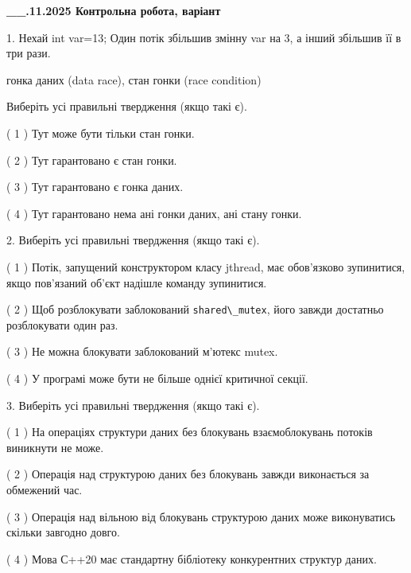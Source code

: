 \documentclass[12pt, ukrainian]{article}
\def\code#1{\Verb!#1!}
\begin{document}
\newpage
\begin {large}

\textbf{\_\_.11.2025 Контрольна робота, варіант  }\par


{
1. Нехай int var=13; Один потік збільшив змінну var на 3, а інший збільшив її в три рази.

гонка даних (data race), стан гонки (race condition)

Виберіть усі правильні твердження (якщо такі є).\par
\vspace{2mm}
( 1 ) Тут може бути тільки стан гонки.%

( 2 ) Тут гарантовано є стан гонки.%

( 3 ) Тут гарантовано є гонка даних.%

( 4 ) Тут гарантовано нема ані гонки даних, ані стану гонки.%


2. Виберіть усі правильні твердження (якщо такі є).\par
\vspace{2mm}

( 1 ) Потік, запущений конструктором класу jthread, має обов’язково зупинитися, якщо пов’язаний об’єкт надішле команду зупинитися.%

( 2 ) Щоб розблокувати заблокований \code{shared\_mutex}, його завжди достатньо розблокувати один раз.%

( 3 ) Не можна блокувати заблокований м’ютекс mutex.%

( 4 ) У програмі може бути не більше однієї критичної секції.%


3. Виберіть усі правильні твердження (якщо такі є).\par
\vspace{2mm}

( 1 ) На операціях структури даних без блокувань взаємоблокувань потоків виникнути не може.%

( 2 ) Операція над структурою даних без блокувань завжди виконається за обмежений час.%

( 3 ) Операція над вільною від блокувань структурою даних може виконуватись скільки завгодно довго.%

( 4 ) Мова С++20 має стандартну бібліотеку конкурентних структур даних.%


}
\end{large}
\end{document}
